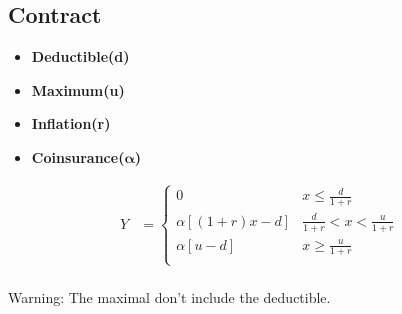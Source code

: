 \documentclass[10pt, french]{article}
\begin{document}
\begin{multicols*}{3}

\section*{Contract}
\begin{itemize}[align=left,leftmargin=*]
    \item \textbf{Deductible(d)}
    \item \textbf{Maximum(u)}
    \item \textbf{Inflation(r)}
    \item \textbf{Coinsurance($\boldsymbol{\alpha}$)}
\end{itemize}
\begin{align*}
    Y &=
    \left\{
        \begin{array}{cc}
        0 & x \leq \frac{d}{1+r}\\
        \alpha[(1+r)x-d] & \frac{d}{1+r} < x < \frac{u}{1+r} \\
        \alpha[u - d] & x \geq \frac{u}{1+r} \\
        \end{array}
    \right.
\end{align*} \\
{\color{red} Warning: The maximal don't include the deductible.}


\end{multicols*}
\end{document}
